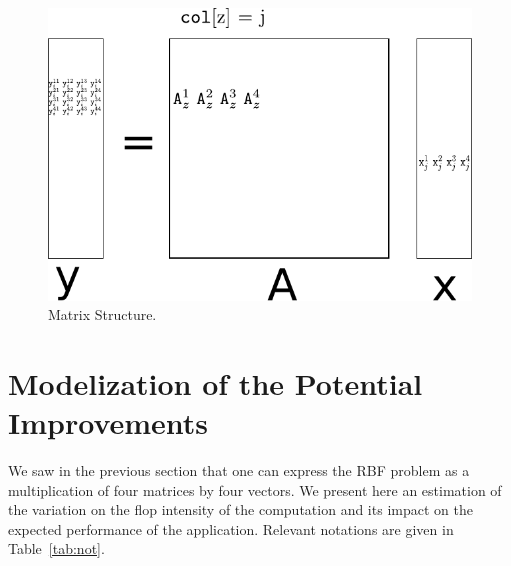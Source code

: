 \documentclass[10pt,conference,compsocconf]{IEEEtran}
\begin{document}
\begin{figure}
  \centering
  \includegraphics[width=\linewidth]{figures/matrix_not.pdf}
  \caption{Matrix Structure.}
  \label{fig:mat_struct}
\end{figure}



\section{Modelization of the Potential Improvements}
\label{sec:model}

We saw in the previous section that one can express the RBF problem as
a multiplication of four matrices by four vectors. We present here an
estimation of the variation on the flop intensity of the computation
and its impact on the expected performance of the
application. Relevant notations are given in Table~\ref{tab:not}.
\end{document}
